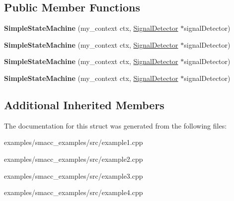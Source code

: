 \subsection*{Public Member Functions}
\begin{DoxyCompactItemize}
\item 
\hypertarget{structSimpleStateMachine_a66930f5ee365d71b115ef1e88da23a3e}{{\bfseries Simple\-State\-Machine} (my\-\_\-context ctx, \hyperlink{classsmacc_1_1SignalDetector}{Signal\-Detector} $\ast$signal\-Detector)}\label{structSimpleStateMachine_a66930f5ee365d71b115ef1e88da23a3e}

\item 
\hypertarget{structSimpleStateMachine_a66930f5ee365d71b115ef1e88da23a3e}{{\bfseries Simple\-State\-Machine} (my\-\_\-context ctx, \hyperlink{classsmacc_1_1SignalDetector}{Signal\-Detector} $\ast$signal\-Detector)}\label{structSimpleStateMachine_a66930f5ee365d71b115ef1e88da23a3e}

\item 
\hypertarget{structSimpleStateMachine_a66930f5ee365d71b115ef1e88da23a3e}{{\bfseries Simple\-State\-Machine} (my\-\_\-context ctx, \hyperlink{classsmacc_1_1SignalDetector}{Signal\-Detector} $\ast$signal\-Detector)}\label{structSimpleStateMachine_a66930f5ee365d71b115ef1e88da23a3e}

\item 
\hypertarget{structSimpleStateMachine_a66930f5ee365d71b115ef1e88da23a3e}{{\bfseries Simple\-State\-Machine} (my\-\_\-context ctx, \hyperlink{classsmacc_1_1SignalDetector}{Signal\-Detector} $\ast$signal\-Detector)}\label{structSimpleStateMachine_a66930f5ee365d71b115ef1e88da23a3e}

\end{DoxyCompactItemize}
\subsection*{Additional Inherited Members}


The documentation for this struct was generated from the following files\-:\begin{DoxyCompactItemize}
\item 
examples/smacc\-\_\-examples/src/example1.\-cpp\item 
examples/smacc\-\_\-examples/src/example2.\-cpp\item 
examples/smacc\-\_\-examples/src/example3.\-cpp\item 
examples/smacc\-\_\-examples/src/example4.\-cpp\end{DoxyCompactItemize}
